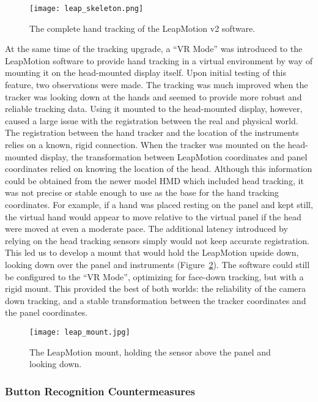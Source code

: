\begin{figure}
    \centering
    \texttt{[image: leap\_skeleton.png]}
    \caption{The complete hand tracking of the LeapMotion v2 software.}
    \label{fig:proto_skeleton}
\end{figure}

At the same time of the tracking upgrade, a ``VR Mode'' was introduced to the LeapMotion software to provide hand tracking in a virtual environment by way of mounting it on the head-mounted display itself.
Upon initial testing of this feature, two observations were made.
The tracking was much improved when the tracker was looking down at the hands and seemed to provide more robust and reliable tracking data.
Using it mounted to the head-mounted display, however, caused a large issue with the registration between the real and physical world.
The registration between the hand tracker and the location of the instruments relies on a known, rigid connection.
When the tracker was mounted on the head-mounted display, the transformation between LeapMotion coordinates and panel coordinates relied on knowing the location of the head.
Although this information could be obtained from the newer model HMD which included head tracking, it was not precise or stable enough to use as the base for the hand tracking coordinates.
For example, if a hand was placed resting on the panel and kept still, the virtual hand would appear to move relative to the virtual panel if the head were moved at even a moderate pace.
The additional latency introduced by relying on the head tracking sensors simply would not keep accurate registration.
This led us to develop a mount that would hold the LeapMotion upside down, looking down over the panel and instruments (Figure~\ref{fig:proto_leap_mount}).
The software could still be configured to the ``VR Mode'', optimizing for face-down tracking, but with a rigid mount.
This provided the best of both worlds: the reliability of the camera down tracking, and a stable transformation between the tracker coordinates and the panel coordinates.

\begin{figure}
    \centering
    \texttt{[image: leap\_mount.jpg]}
    \caption{The LeapMotion mount, holding the sensor above the panel and looking down.}
    \label{fig:proto_leap_mount}
\end{figure}

\subsubsection{Button Recognition Countermeasures}

